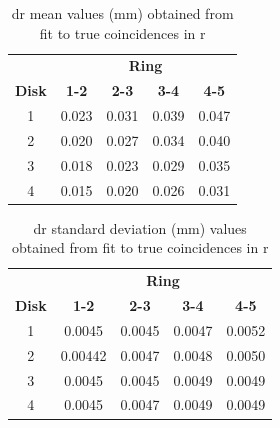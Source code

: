 
\newpage
\begin{table}[H]
  \centering
  \caption[dr mean values for two-fold in r]{dr mean values (mm) obtained from fit to true coincidences in r}
\begin{tabular}{ccccc}
 & \multicolumn{4}{c}{\textbf{Ring}} \\
\textbf{Disk} & \textbf{1-2} & \textbf{2-3} & \textbf{3-4} & \textbf{4-5} \\
\hline
1 & 0.023 & 0.031 & 0.039 & 0.047 \\
2 & 0.020 & 0.027 & 0.034 & 0.040 \\
3 & 0.018 & 0.023 & 0.029 & 0.035 \\
4 & 0.015 & 0.020  & 0.026 & 0.031 \\
\end{tabular}
\label{tab:my_label_55}
\end{table}


\begin{table}[H]
  \centering
  \caption[dr cut values for two-fold in r]{dr standard deviation (mm) values obtained from fit to true coincidences in r}
\begin{tabular}{ccccc}
 & \multicolumn{4}{c}{\textbf{Ring}} \\
\textbf{Disk} & \textbf{1-2} & \textbf{2-3} & \textbf{3-4} & \textbf{4-5} \\
\hline
1 & 0.0045 & 0.0045 & 0.0047 & 0.0052 \\
2 & 0.00442 & 0.0047 & 0.0048 & 0.0050 \\
3 & 0.0045 & 0.0045 & 0.0049 & 0.0049 \\
4 & 0.0045 & 0.0047 & 0.0049 & 0.0049 \\
\end{tabular}
\label{tab:my_label_53}
\end{table}



